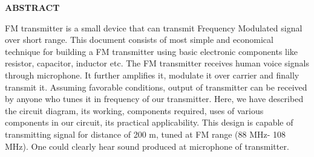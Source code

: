 \thispagestyle{plain}

\begin{center}
	\Large {\bf \uppercase{ABSTRACT}}
\end{center}

\vspace{3\baselineskip}

\noindent
%
%
%

FM transmitter is a small device that can transmit Frequency Modulated
signal over short range. This document consists of most simple and
economical technique for building a FM transmitter using basic electronic
components like resistor, capacitor, inductor etc. The FM transmitter receives
human voice signals through microphone. It further amplifies it, modulate it
over carrier and finally transmit it. Assuming favorable conditions, output of
transmitter can be received by anyone who tunes it in frequency of our
transmitter. Here, we have described the circuit diagram, its working,
components required, uses of various components in our circuit, its practical
applicability. This design is capable of transmitting signal for distance of
200 m, tuned at FM range (88 MHz- 108 MHz). One could clearly hear sound produced at
microphone of transmitter.


